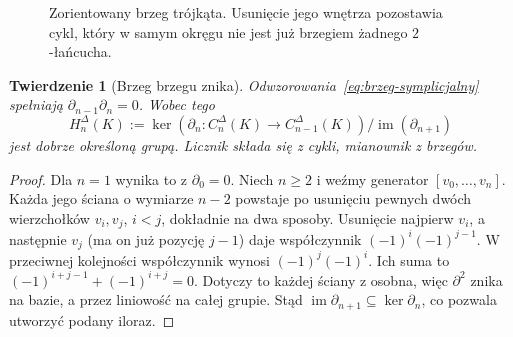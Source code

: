 \documentclass[11pt,a4paper,oneside]{report}
\theoremstyle{plain}
\newtheorem{twierdzenie}{Twierdzenie}[section]
\theoremstyle{definition}
\theoremstyle{remark}
\begin{document}
\begin{figure}[!htbp]
\centering
{}
\caption{Zorientowany brzeg trójkąta. Usunięcie jego
wnętrza pozostawia cykl, który w samym okręgu
nie jest już brzegiem żadnego $2$-łańcucha.}
\label{fig:homologia-trojkat}
\end{figure}

\begin{twierdzenie}[Brzeg brzegu znika]
\label{thm:brzeg-brzegu}
Odwzorowania~\eqref{eq:brzeg-symplicjalny}
spełniają $\partial_{n-1}\partial_n=0$.
Wobec tego
\[
 H_n^\Delta(K):=
 \ker(\partial_n:C_n^\Delta(K)\to C_{n-1}^\Delta(K))
 \big/
 \operatorname{im}(\partial_{n+1})
\]
jest dobrze określoną grupą. Licznik składa
się z \emph{cykli}, mianownik z \emph{brzegów}.
\end{twierdzenie}
\begin{proof}
Dla $n=1$ wynika to z $\partial_0=0$.
Niech $n\geq2$ i weźmy generator
$[v_0,\ldots,v_n]$. Każda jego ściana
o wymiarze $n-2$ powstaje po usunięciu
pewnych dwóch wierzchołków $v_i,v_j$,
$i<j$, dokładnie na dwa sposoby.
Usunięcie najpierw $v_i$, a następnie
$v_j$ (ma on już pozycję $j-1$) daje
współczynnik $(-1)^i(-1)^{j-1}$.
W przeciwnej kolejności współczynnik
wynosi $(-1)^j(-1)^i$.
Ich suma to
$(-1)^{i+j-1}+(-1)^{i+j}=0$.
Dotyczy to każdej ściany z osobna,
więc $\partial^2$ znika na bazie,
a przez liniowość na całej grupie.
Stąd $\operatorname{im}\partial_{n+1}
\subseteq\ker\partial_n$, co pozwala
utworzyć podany iloraz.
\end{proof}
\end{document}
